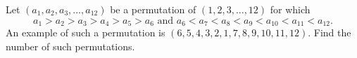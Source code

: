 Let $(a_1,a_2,a_3,...,a_{12})$ be a permutation of $(1,2,3,...,12)$ for which \[ a_1>a_2>a_3>a_4>a_5>a_6 \text{ and } a_6<a_7<a_8<a_9<a_{10}<a_{11}<a_{12}. \]
An example of such a permutation is $(6,5,4,3,2,1,7,8,9,10,11,12)$. Find the number of such permutations.